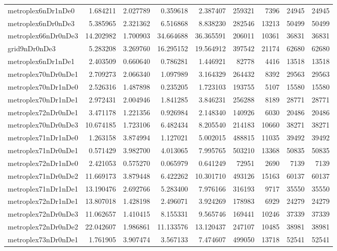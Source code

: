\begin{longtable}{|l|r|r|r|r|r|r|r|r|}
metroplex6nDr1nDe0 & 1.684211 & 2.027789 & 0.359618 & 2.387407 & 259321 & 7396 & 24945 & 24945 \\
metroplex6nDr0nDe3 & 5.385965 & 2.321362 & 6.516868 & 8.838230 & 282546 & 13213 & 50499 & 50499 \\
metroplex66nDr0nDe3 & 14.202982 & 1.700903 & 34.664688 & 36.365591 & 206011 & 10361 & 36831 & 36831 \\
grid9nDr0nDe3 & 5.283208 & 3.269760 & 16.295152 & 19.564912 & 397542 & 21174 & 62680 & 62680 \\
metroplex6nDr1nDe1 & 2.403509 & 0.660640 & 0.786281 & 1.446921 & 82778 & 4416 & 13518 & 13518 \\
metroplex70nDr0nDe1 & 2.709273 & 2.066340 & 1.097989 & 3.164329 & 264432 & 8392 & 29563 & 29563 \\
metroplex70nDr1nDe0 & 2.526316 & 1.487898 & 0.235205 & 1.723103 & 193755 & 5107 & 15580 & 15580 \\
metroplex70nDr1nDe1 & 2.972431 & 2.004946 & 1.841285 & 3.846231 & 256288 & 8189 & 28771 & 28771 \\
metroplex72nDr0nDe1 & 3.471178 & 1.221356 & 0.926984 & 2.148340 & 140926 & 6030 & 20486 & 20486 \\
metroplex70nDr0nDe3 & 10.674185 & 1.723106 & 6.482434 & 8.205540 & 214183 & 10660 & 38271 & 38271 \\
metroplex71nDr1nDe0 & 1.263158 & 3.874994 & 1.127021 & 5.002015 & 488815 & 11035 & 39492 & 39492 \\
metroplex71nDr0nDe1 & 0.571429 & 3.982700 & 4.013065 & 7.995765 & 503210 & 13368 & 50835 & 50835 \\
metroplex72nDr1nDe0 & 2.421053 & 0.575270 & 0.065979 & 0.641249 & 72951 & 2690 & 7139 & 7139 \\
metroplex71nDr0nDe2 & 11.669173 & 3.879448 & 6.422262 & 10.301710 & 493126 & 15163 & 60137 & 60137 \\
metroplex71nDr1nDe1 & 13.190476 & 2.692766 & 5.283400 & 7.976166 & 316193 & 9717 & 35550 & 35550 \\
metroplex72nDr1nDe1 & 13.807018 & 1.428198 & 2.496071 & 3.924269 & 178983 & 6929 & 24279 & 24279 \\
metroplex72nDr0nDe3 & 11.062657 & 1.410415 & 8.155331 & 9.565746 & 169441 & 10246 & 37339 & 37339 \\
metroplex72nDr0nDe2 & 22.042607 & 1.986861 & 11.133576 & 13.120437 & 247107 & 10485 & 38981 & 38981 \\
metroplex73nDr0nDe1 & 1.761905 & 3.907474 & 3.567133 & 7.474607 & 499050 & 13718 & 52541 & 52541 \\

\end{longtable}
